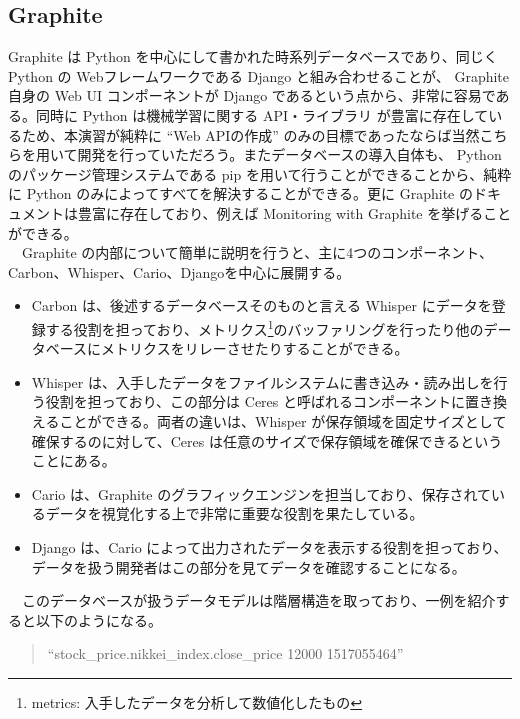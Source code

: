 \documentclass{scrartcl}
\begin{document}
\subsection{Graphite}
\label{sec:orgccc8eb8}
Graphite は Python を中心にして書かれた時系列データベースであり、同じく Python の Webフレームワークである Django と組み合わせることが、 Graphite 自身の Web UI コンポーネントが Django であるという点から、非常に容易である。同時に Python は機械学習に関する API・ライブラリ が豊富に存在しているため、本演習が純粋に ``Web APIの作成'' のみの目標であったならば当然こちらを用いて開発を行っていただろう。またデータベースの導入自体も、 Python のパッケージ管理システムである pip を用いて行うことができることから、純粋に Python のみによってすべてを解決することができる。更に Graphite のドキュメントは豊富に存在しており、例えば Monitoring with Graphite \cite{graphite-oreilly} を挙げることができる。\\
　Graphite の内部について簡単に説明を行うと、主に4つのコンポーネント、Carbon、Whisper、Cario、Djangoを中心に展開する。\\
\begin{itemize}
\item Carbon は、後述するデータベースそのものと言える Whisper にデータを登録する役割を担っており、メトリクス\footnote[1]{metrics: 入手したデータを分析して数値化したもの}のバッファリングを行ったり他のデータベースにメトリクスをリレーさせたりすることができる。\\
\item Whisper は、入手したデータをファイルシステムに書き込み・読み出しを行う役割を担っており、この部分は Ceres と呼ばれるコンポーネントに置き換えることができる。両者の違いは、Whisper が保存領域を固定サイズとして確保するのに対して、Ceres は任意のサイズで保存領域を確保できるということにある。\\
\item Cario は、Graphite のグラフィックエンジンを担当しており、保存されているデータを視覚化する上で非常に重要な役割を果たしている。\\
\item Django は、Cario によって出力されたデータを表示する役割を担っており、データを扱う開発者はこの部分を見てデータを確認することになる。\\
\end{itemize}

　このデータベースが扱うデータモデルは階層構造を取っており、一例を紹介すると以下のようになる。\\
\begin{verse}
``stock\_price.nikkei\_index.close\_price 12000 1517055464''\\
\end{verse}
\end{document}
